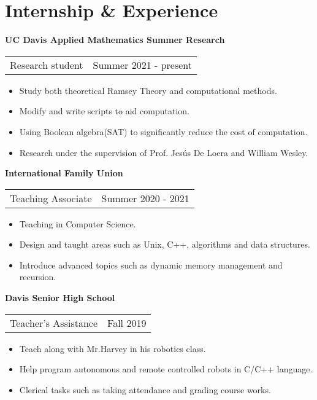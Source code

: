\section{\sc Internship \& Experience}
{\bf{UC Davis Applied Mathematics Summer Research}}\\
\begin{tabular}{@{}p{4in}p{2in}}
Research student & Summer 2021 - present\\
\end{tabular}
\begin{itemize}
\setlength\itemsep{0em}
\item Study both theoretical Ramsey Theory and computational methods.
\item Modify and write scripts to aid computation.
\item Using Boolean algebra(SAT) to significantly reduce the cost of computation.
\item Research under the supervision of Prof. Jes\'{u}s De Loera and William Wesley. 
\end{itemize}

{\bf{International Family Union}}\\
\begin{tabular}{@{}p{4in}p{2in}}
Teaching Associate & Summer 2020 - 2021\\
\end{tabular}
\begin{itemize}
\setlength\itemsep{0em}
\item Teaching in Computer Science.
\item Design and taught areas such as Unix, C++, algorithms and data structures.
\item Introduce advanced topics such as dynamic memory management and recursion.
\end{itemize}
{\bf{Davis Senior High School}}\\
\begin{tabular}{@{}p{4in}p{2in}}
Teacher's Assistance & Fall 2019\\
\end{tabular}
\begin{itemize}
\setlength\itemsep{0em}
\item Teach along with Mr.Harvey in his robotics class.
\item Help program autonomous and remote controlled robots in C/C++ language.
\item Clerical tasks such as taking attendance and grading course works. 
\end{itemize}
\endinput